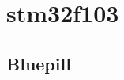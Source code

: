 \documentclass[letterpaper,10pt,english]{sphinxmanual}
\begin{document}
\section{stm32f103}
\label{\detokenize{stm/stm32f103:stm32f103}}\label{\detokenize{stm/stm32f103::doc}}
\noindent{}

\noindent{}

\noindent{}

\noindent{}


\subsection{Bluepill}
\label{\detokenize{stm/stm32f103:bluepill}}
\noindent{}
\end{document}

